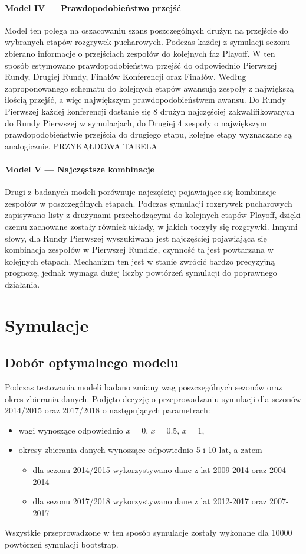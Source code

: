 \documentclass[inzynierska]{pwr_wmat_praca_dyplomowa}
\theoremstyle{plain}
\numberwithin{theorem}{chapter}
\theoremstyle{definition}
\numberwithin{theorem}{chapter}
\begin{document}
\subsubsection{Model IV --- Prawdopodobieństwo przejść}
Model ten polega na oszacowaniu szans poszczególnych drużyn na przejście do wybranych etapów rozgrywek pucharowych. Podczas każdej z symulacji sezonu zbierano informacje o przejściach zespołów do kolejnych faz Playoff. W ten sposób estymowano prawdopodobieństwa przejść do odpowiednio Pierwszej Rundy, Drugiej Rundy, Finałów Konferencji oraz Finałów. Według zaproponowanego schematu do kolejnych etapów awansują zespoły z największą ilością przejść, a więc największym prawdopodobieństwem awansu. Do Rundy Pierwszej każdej konferencji dostanie się 8 drużyn najczęściej zakwalifikowanych do Rundy Pierwszej w symulacjach, do Drugiej 4 zespoły o największym prawdopodobieństwie przejścia do drugiego etapu, kolejne etapy wyznaczane są analogicznie.  
PRZYKĄŁDOWA TABELA

\subsubsection{Model V --- Najczęstsze kombinacje}
Drugi z badanych modeli porównuje najczęściej pojawiające się kombinacje zespołów w poszczególnych etapach. Podczas symulacji rozgrywek pucharowych zapisywano listy z drużynami przechodzącymi do kolejnych etapów Playoff, dzięki czemu zachowane zostały również układy, w jakich toczyły się rozgrywki. Innymi słowy, dla Rundy Pierwszej wyszukiwana jest najczęściej pojawiająca się kombinacja zespołów w Pierwszej Rundzie, czynność ta jest powtarzana w kolejnych etapach. Mechanizm ten jest w stanie zwrócić bardzo precyzyjną prognozę, jednak wymaga dużej liczby powtórzeń symulacji do poprawnego działania. 

\chapter{Symulacje}
\section{Dobór optymalnego modelu}
Podczas testowania modeli badano zmiany wag poszczególnych sezonów oraz okres zbierania danych. Podjęto decyzję o przeprowadzaniu symulacji dla sezonów 2014/2015 oraz 2017/2018 o następujących parametrach:
\begin{itemize}
	\item wagi wynoszące odpowiednio $x=0$, $x=0.5$, $x=1$,
	\item okresy zbierania danych wynoszące odpowiednio 5 i 10 lat, a zatem
	\begin{itemize}
		\item dla sezonu 2014/2015 wykorzystywano dane z lat 2009-2014 oraz 2004-2014
		\item dla sezonu 2017/2018 wykorzystywano dane z lat 2012-2017 oraz 2007-2017
	\end{itemize}
\end{itemize}
Wszystkie przeprowadzone w ten sposób symulacje zostały wykonane dla 10000 powtórzeń symulacji bootstrap. 
\end{document}
